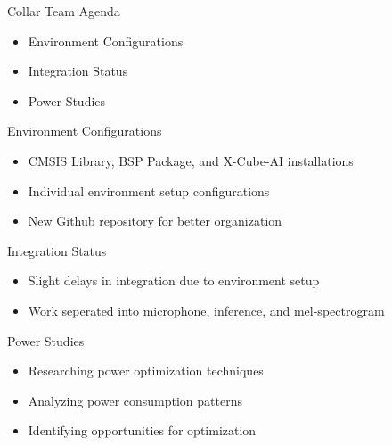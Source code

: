 \begin{frame}{Collar Team Agenda}
    \begin{itemize}
        \item Environment Configurations
        \item Integration Status
        \item Power Studies
    \end{itemize}
\end{frame}

\begin{frame}{Environment Configurations}
    \begin{itemize}
        \item CMSIS Library, BSP Package, and X-Cube-AI installations
        \item Individual environment setup configurations
        \item New Github repository for better organization
    \end{itemize}
\end{frame}

\begin{frame}{Integration Status}
    \begin{itemize}
        \item Slight delays in integration due to environment setup
        \item Work seperated into microphone, inference, and mel-spectrogram
    \end{itemize}   
\end{frame}

\begin{frame}{Power Studies}
    \begin{itemize}
        \item Researching power optimization techniques
        \item Analyzing power consumption patterns
        \item Identifying opportunities for optimization
    \end{itemize}
\end{frame}


